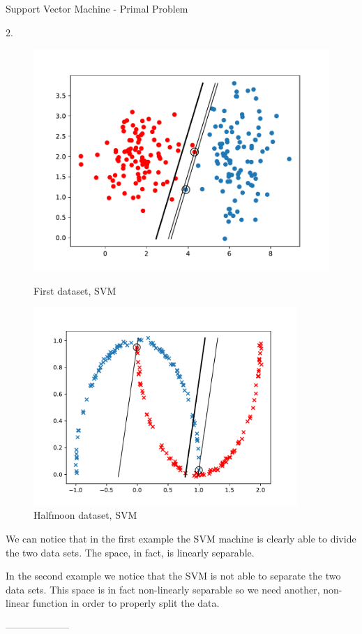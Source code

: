 \documentclass[english]{exercisesheet}
\begin{document}
 \cleardoublepage
 \begin{nexercise}{Support Vector Machine - Primal Problem}
 \par
 \begin{solution} 2.
        \begin{figure}[H]
        \centering
        \includegraphics[width=13cm]{simple-line.pdf}
        \caption{First dataset, SVM}
        \centering
        \cleardoublepage
        \includegraphics[width=10cm]{moon-line.pdf}
        \caption{Halfmoon dataset, SVM}
        \end{figure}
    
 
 We can notice that in the first example the SVM machine is clearly able to divide the two data sets. The space, in fact, is linearly separable.
 
 In the second example we notice that the SVM is not able to separate the two data sets. This space is in fact non-linearly separable so we need another, non-linear function in order to properly split the data.
 
  
 \end{solution}
 --------------------
 \end{nexercise}
\end{document}
